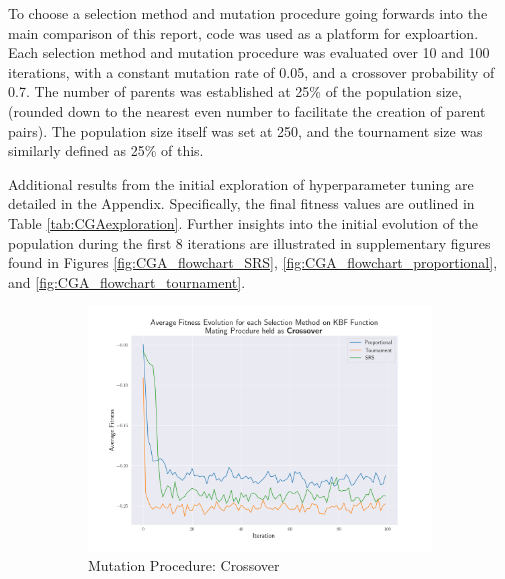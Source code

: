 \documentclass[10pt]{article}
\begin{document}
\begin{multicols}{2}
To choose a selection method and mutation procedure going forwards into the main comparison of this report, code %
was used as a platform for exploartion. Each selection method and mutation procedure was evaluated over 10 and 100 iterations, with a constant mutation rate of 0.05, and a crossover probability of 0.7. The number of parents was established at 25\% of the population size, (rounded down to the nearest even number to facilitate the creation of parent pairs). The population size itself was set at 250, and the tournament size was similarly defined as 25\% of this.

Additional results from the initial exploration of hyperparameter tuning are detailed in the Appendix. Specifically, the final fitness values are outlined in Table \ref{tab:CGAexploration}. Further insights into the initial evolution of the population during the first 8 iterations are illustrated in supplementary figures found in Figures \ref{fig:CGA_flowchart_SRS}, \ref{fig:CGA_flowchart_proportional}, and \ref{fig:CGA_flowchart_tournament}.
\begin{figure}[H]
    \centering
    \begin{subfigure}{0.44\textwidth}
        \includegraphics[width=\textwidth]{../figures/Ungenerated Images/Fitness_Evolution_Crossover.png}
        \caption{Mutation Procedure: Crossover}
    \end{subfigure}
    \begin{subfigure}{0.44\textwidth}

\end{subfigure}
\end{figure}
\end{multicols}
\end{document}
